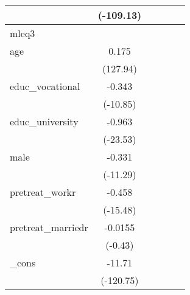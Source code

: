 {\begin{tabular}{l*{5}{c}}
            &   (-109.13)         &                     &                     &                     &                     \\
\hline
mleq3       &                     &                     &                     &                     &                     \\
age         &       0.175\sym{***}&                     &                     &                     &                     \\
            &    (127.94)         &                     &                     &                     &                     \\
[1em]
educ\_vocational&      -0.343\sym{***}&                     &                     &                     &                     \\
            &    (-10.85)         &                     &                     &                     &                     \\
[1em]
educ\_university&      -0.963\sym{***}&                     &                     &                     &                     \\
            &    (-23.53)         &                     &                     &                     &                     \\
[1em]
male        &      -0.331\sym{***}&                     &                     &                     &                     \\
            &    (-11.29)         &                     &                     &                     &                     \\
[1em]
pretreat\_workr&      -0.458\sym{***}&                     &                     &                     &                     \\
            &    (-15.48)         &                     &                     &                     &                     \\
[1em]
pretreat\_marriedr&     -0.0155         &                     &                     &                     &                     \\
            &     (-0.43)         &                     &                     &                     &                     \\
[1em]
\_cons      &      -11.71\sym{***}&                     &                     &                     &                     \\
            &   (-120.75)         &                     &                     &                     &                     \\

\end{tabular}}
